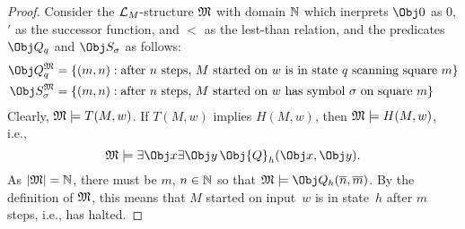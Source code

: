 \documentclass[open-logic-section]{subfiles}
\begin{document}
\begin{proof}
Consider the $\mathcal L_M$-structure $\mathfrak M$ with domain $\mathbb{N}$
which inerprets $\Obj 0$ as $0$, $'$ as the successor function, and
$<$ as the lest-than relation, and the predicates $\Obj Q_q$ and
$\Obj S_\sigma$ as follows:
\begin{align*}
\Assign{\Obj Q_q}{M} & = \{(m, n) : \text{after $n$ steps, $M$ started
  on $w$ is in state $q$ scanning square~$m$}\} \\
\Assign{\Obj S_\sigma}{M} & = \{(m, n) : \text{after $n$ steps, $M$ started
  on $w$ has symbol~$\sigma$ on square~$m$}\} \\
\end{align*}
Clearly, $\Sat{M}{T(M, w)}$. If $T(M, w)$ implies $H(M, w)$, then
$\Sat{M}{H(M, w)}$, i.e.,
\[
\Sat{M}{\lexists[\Obj x]\lexists[\Obj y][\Obj{Q}_h(\Obj x, \Obj y)]}.
\]
As $\left| \mathfrak M \right| = \mathbb{N}$, there must be $m$, $n \in \mathbb{N}$ so that
$\Sat{M}{\Obj Q_h(\overline{n}, \overline{m})}$. By the definition of
$\mathfrak M$, this means that $M$ started on input~$w$ is in state~$h$
after $m$ steps, i.e., has halted.
\end{proof}
\end{document}

